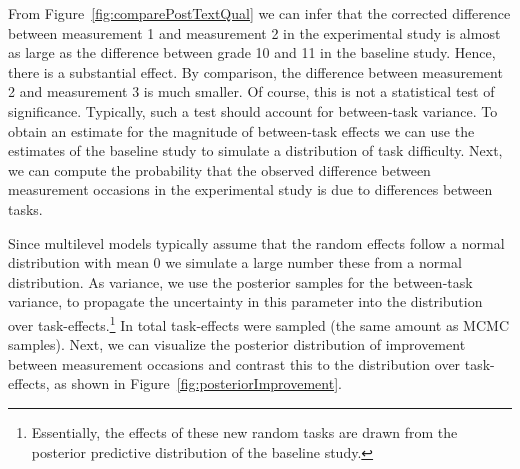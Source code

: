 \documentclass[a4paper]{article}
\newcommand{\getValInt}[3]{%
	\pgfplotstablegetelem{#1}{#2}\of{#3}%
	\pgfmathprintnumber[fixed, fixed zerofill=false]{\pgfplotsretval}%
}
\begin{document}
From Figure~\ref{fig:comparePostTextQual} we can infer that the corrected difference between measurement 1 and measurement 2 in the experimental study is almost as large as the difference between grade 10 and 11 in the baseline study. Hence, there is a substantial effect. By comparison, the difference between measurement 2 and measurement 3 is much smaller. Of course, this is not a statistical test of significance. Typically, such a test should account for between-task variance. To obtain an estimate for the magnitude of between-task effects we can use the estimates of the baseline study to simulate a distribution of task difficulty. Next, we can compute the probability that the observed difference between measurement occasions in the experimental study is due to differences between tasks.

Since multilevel models typically assume that the random effects follow a normal distribution with mean 0 we simulate a large number these from a normal distribution. As variance, we use the posterior samples for the between-task variance, to propagate the uncertainty in this parameter into the distribution over task-effects.\footnote{Essentially, the effects of these new random tasks are drawn from the posterior predictive distribution of the baseline study.} In total \getValInt{0}{total}{\tbMCMCsettings} task-effects were sampled (the same amount as MCMC samples). Next, we can visualize the posterior distribution of improvement between measurement occasions and contrast this to the distribution over task-effects, as shown in Figure~\ref{fig:posteriorImprovement}.
\end{document}
